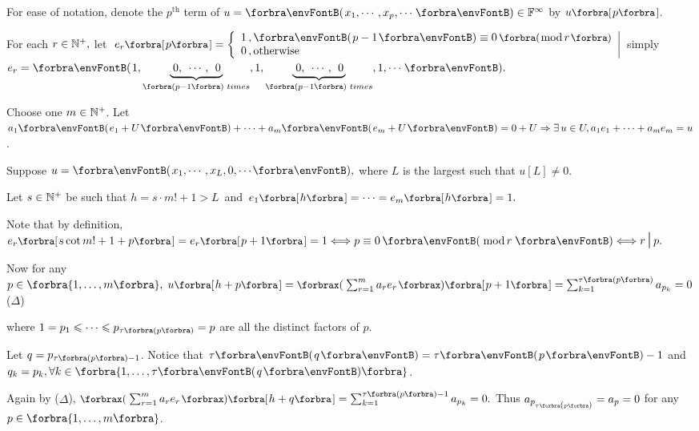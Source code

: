 For ease of notation, denote the $p^\text{th}$ term of $u=\Par{x_1,\cdots,x_p,\cdots}\in\Fbb^{\infty}$ by $u\Sbra{p}$.\vspace{6pt}\par\quad
For each $r\in{\mathbb{N}^+},$ let $\;e_r\Sbra{p}=\hMath[0pt]{l}{\left\{}{\right|}{1\,,\Par{p-1}\equiv 0\,\BigPar{\text{mod}\,r}\\0\,,\text{otherwise}}$ \;\;simply $e_r=\Par{1,\underbrace{\;0,\;\,\cdots,\;\,0\,}_{\SmallPar{p-1}\,\,times},1,\underbrace{\;0,\;\,\cdots,\;\,0\,}_{\SmallPar{p-1}\,\,times},1,\cdots}.$\vspace{6pt}\par\quad
Choose one $m\in{\mathbb{N}^+}$. Let $a_1\Par{e_1+U}+\dots+a_m\Par{e_m+U}=0+U\Rightarrow\exists\,u\in U,a_1 e_1+\dots+a_m e_m=u$.\vspace{4pt}\par\quad
Suppose $u=\Par{x_1,\cdots,x_L,{0,\cdots}},$ where $L$ is the largest such that $u[L]\neq 0.$\vspace{4pt}\par\quad
Let $s\in{\mathbb{N}^+}$ be such that $h=s\cdot m!+1> L$\, and \,$e_1\Sbra{h}=\cdots=e_m\Sbra{h}=1.$\vspace{6pt}\par\quad
Note that by definition, \;$e_r\Sbra{s\cot m!+1+p}=e_r\Sbra{p+1}=1\Longleftrightarrow p\equiv 0\,\Par{\,\text{mod}\,r\,}\Longleftrightarrow r\,\mmid\,p.$\vspace{6pt}\par\quad
Now for any $p\in\Bra{1,\dots,m},\;u\Sbra{h+p}=\XPar{\sum_{r=1}^m a_r e_r}\Sbra{p+1}=\sum_{k=1}^{\tau\SmallPar{p}}a_{p_k}=0$\hfill(${\Delta}$)\vspace{6pt}\par\quad
where $1=p_1\leqslant\cdots\leqslant p_{\tau\SmallPar{p}}=p$ are all the distinct factors of $p.$\vspace{4pt}\par\quad
Let $q=p_{\tau\SmallPar{p}-1}$. Notice that $\tau\Par{q}=\tau\Par{p}-1$ and $q_k=p_k,\forall k\in\Bra{1,\dots,\tau\Par{q}}$.\par\vspace{6pt}\quad
Again by ($\Delta$), $\XPar{\sum_{r=1}^m a_r e_r}\Sbra{h+q}=\sum_{k=1}^{\tau\SmallPar{p}-1}a_{p_k}=0.$ Thus $a_{p_{\tau\SmallPar{p}}}=a_p=0$ for any $p\in\Bra{1,\dots,m}$.\vspace{8pt}\par\quad
